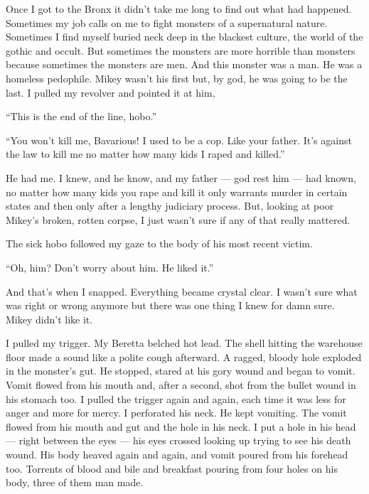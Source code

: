 Once I got to the Bronx it didn't take me long to find out
what had happened. Sometimes my job calls on me to fight monsters
of a supernatural nature. Sometimes I find myself buried neck deep
in the blackest culture, the world of the gothic and occult. But
sometimes the monsters are more horrible than monsters because
sometimes the monsters are men. And this monster was a man. He was
a homeless pedophile. Mikey wasn't his first but, by god, he
was going to be the last. I pulled my revolver and pointed it at
him,



``This is the end of the line, hobo.''

``You won't kill me, Bavarious! I used to be a cop. Like
your father. It's against the law to kill me no matter how
many kids I raped and killed.''

He had me. I knew, and he know, and my father --- god rest him
--- had known, no matter how many kids you rape and kill it
only warrants murder in certain states and then only after a
lengthy judiciary process. But, looking at poor Mikey's
broken, rotten corpse, I just wasn't sure if any of that
really mattered.



The sick hobo followed my gaze to the body of his most recent
victim.



``Oh, him? Don't worry about him. He liked
it.''



And that's when I snapped. Everything became crystal clear. I
wasn't sure what was right or wrong anymore but there was one
thing I knew for damn sure. Mikey didn't like it.



I pulled my trigger. My Beretta belched hot lead. The shell hitting
the warehouse floor made a sound like a polite cough afterward. A
ragged, bloody hole exploded in the monster's gut. He
stopped, stared at his gory wound and began to vomit. Vomit flowed
from his mouth and, after a second, shot from the bullet wound in
his stomach too. I pulled the trigger again and again, each time it
was less for anger and more for mercy. I perforated his neck. He
kept vomiting. The vomit flowed from his mouth and gut and the hole
in his neck. I put a hole in his head --- right between the
eyes --- his eyes crossed looking up trying to see his death
wound. His body heaved again and again, and vomit poured from his
forehead too. Torrents of blood and bile and breakfast pouring from
four holes on his body, three of them man made.



